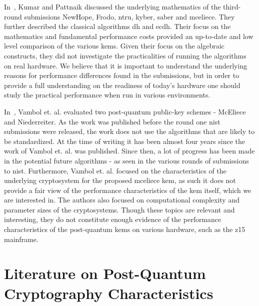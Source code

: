 In~\cite{kumar2020}, Kumar and Pattnaik discussed the underlying mathematics of the third-round submissions NewHope, Frodo, \gls{ntru}, \gls{kyber}, \gls{saber} and \gls{mceliece}. They further described the classical algorithms \gls{dh} and \gls{ecdh}. Their focus on the mathematics and fundamental performance costs provided an up-to-date and low level comparison of the various \glspl{kem}. Given their focus on the algebraic constructs, they did not investigate the practicalities of running the algorithms on real hardware. We believe that it is important to understand the underlying reasons for performance differences found in the submissions, but in order to provide a full understanding on the readiness of today's hardware one should study the practical performance when run in various environments.

In~\cite{vambol2017}, Vambol et. al. evaluated two \gls{post-quantum} public-key schemes - McEliece and Niederreiter. As the work was published before the round one \gls{nist} submissions were released, the work does not use the algorithms that are likely to be standardized. At the time of writing it has been almost four years since the work of Vambol et. al. was published. Since then, a lot of progress has been made in the potential future algorithms - as seen in the various rounds of submissions to \gls{nist}. Furthermore, Vambol et. al. focused on the characteristics of the underlying cryptosystem for the proposed \gls{mceliece} \gls{kem}, as such it does not provide a fair view of the performance characteristics of the \gls{kem} itself, which we are interested in. The authors also focused on computational complexity and parameter sizes of the cryptosystems. Though these topics are relevant and interesting, they do not constitute enough evidence of the performance characteristics of the \gls{post-quantum} \glspl{kem} on various hardware, such as the \gls{z15} mainframe.

\section{Literature on Post-Quantum Cryptography Characteristics}
\label{section:related-work:post-quantum-characteristics}


